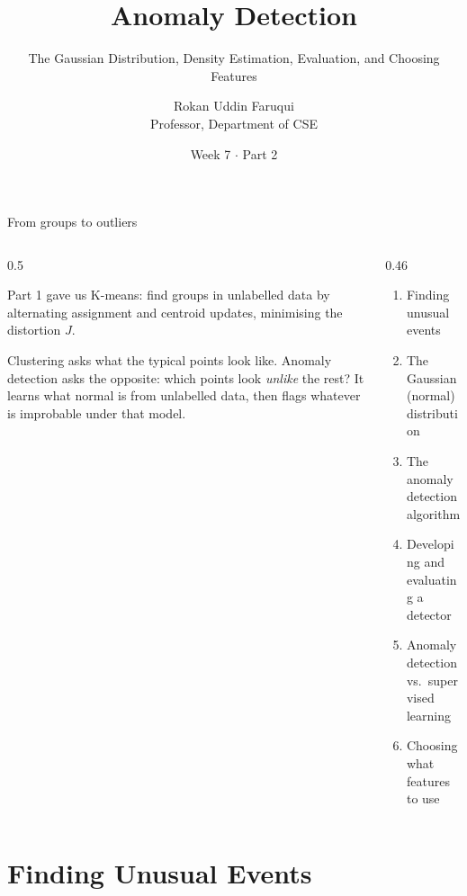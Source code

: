 \documentclass[aspectratio=169,10pt]{beamer}
\title[CSE 815 -- Week 7, Part 2]{Anomaly Detection}
\subtitle{The Gaussian Distribution, Density Estimation, Evaluation, and Choosing Features}
\author{Rokan Uddin Faruqui\\ \small Professor, Department of CSE}
\institute{\small University of Chittagong \\ \texttt{rufaruqui@cu.ac.bd}}
\date[Week 7 / Part 2]{Week 7 $\cdot$ Part 2}
\begin{document}
\begin{frame}
  \titlepage
\end{frame}

\begin{frame}{From groups to outliers}
  \begin{columns}[T,onlytextwidth]
    \begin{column}{0.5\textwidth}
      \begin{block}{Part 1 gave us}
        \footnotesize
        K-means: find groups in unlabelled data by alternating assignment and centroid
        updates, minimising the distortion $J$.
      \end{block}
      \footnotesize
      Clustering asks what the typical points look like. Anomaly detection asks the
      opposite: which points look \emph{unlike} the rest? It learns what normal is from
      unlabelled data, then flags whatever is improbable under that model.
    \end{column}
    \begin{column}{0.46\textwidth}
      \begin{keyidea}[Today]
        \footnotesize
        \begin{enumerate}
          \item Finding unusual events
          \item The Gaussian (normal) distribution
          \item The anomaly detection algorithm
          \item Developing and evaluating a detector
          \item Anomaly detection vs.\ supervised learning
          \item Choosing what features to use
        \end{enumerate}
      \end{keyidea}
    \end{column}
  \end{columns}
\end{frame}

\section{Finding Unusual Events}
\end{document}
